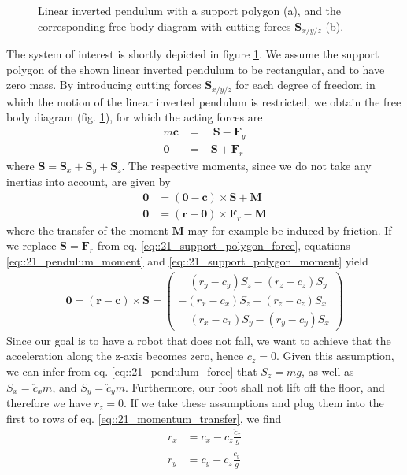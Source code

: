 \begin{figure}[h!]
	\caption{Linear inverted pendulum with a support polygon (a), and the corresponding free body diagram with cutting forces $\bm{S}_{x/y/z}$ (b).}
	\label{fig::21_lip}
\end{figure}
The system of interest is shortly depicted in figure \ref{fig::21_lip}. We assume the support polygon of the shown linear inverted pendulum to be rectangular, and to have zero mass. By introducing cutting forces $\bm{S}_{x/y/z}$ for each degree of freedom in which the motion of the linear inverted pendulum is restricted, we obtain the free body diagram (fig. \ref{fig::21_lip}), for which the acting forces are
\begin{align}
	m\ddot{\bm{c}} &=\quad\bm{S} - \bm{F}_g 
	\label{eq::21_pendulum_force} \\
	\bm{0} &= -\bm{S}+\bm{F}_r
	\label{eq::21_support_polygon_force}
\end{align}
where $\bm{S}=\bm{S}_x+\bm{S}_y+\bm{S}_z$. The respective moments, since we do not take any inertias into account, are given by
\begin{align}
	\bm{0} &= (\bm{0}-\bm{c})\times\bm{S} + \bm{M} 
	\label{eq::21_pendulum_moment}\\	
	\bm{0} &= (\bm{r}-\bm{0})\times\bm{F}_r - \bm{M}
	\label{eq::21_support_polygon_moment}	
\end{align}
where the transfer of the moment $\bm{M}$ may for example be induced by friction. If we replace $\bm{S}=\bm{F}_r$ from eq. \ref{eq::21_support_polygon_force}, equations \ref{eq::21_pendulum_moment} and \ref{eq::21_support_polygon_moment} yield 
\begin{align}
	\bm{0} = (\bm{r}-\bm{c})\times\bm{S} = \begin{pmatrix}
	\quad(r_y - c_y)S_z - (r_z - c_z)S_y \\
	-(r_x - c_x)S_z + (r_z - c_z)S_x \\
	\quad(r_x - c_x)S_y - (r_y - c_y)S_x
	\end{pmatrix}
	\label{eq::21_momentum_transfer}
\end{align}
Since our goal is to have a robot that does not fall, we want to achieve that the acceleration along the z-axis becomes zero, hence $\ddot{c}_z=0$. Given this assumption, we can infer from eq. \ref{eq::21_pendulum_force} that $S_z=mg$, as well as $S_x = \ddot{c}_xm$, and $S_y = \ddot{c}_ym$. Furthermore, our foot shall not lift off the floor, and therefore we have $r_z=0$. If we take these assumptions and plug them into the first to rows of eq. \ref{eq::21_momentum_transfer}, we find
\begin{align}
	r_x &= c_x - c_z\frac{\ddot{c}_x}{g}
	\label{eq::211_zmp_x}\\
	r_y &= c_y - c_z\frac{\ddot{c}_y}{g}
	\label{eq::211_zmp_y}
\end{align}
